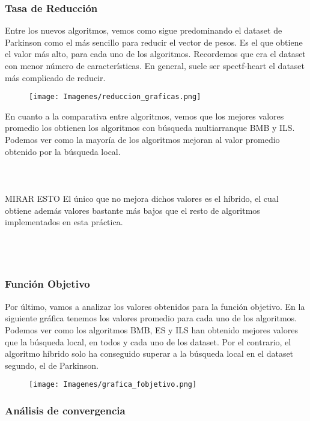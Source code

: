 \documentclass[10pt, a4paper]{article}
\theoremstyle{theorem-style}
\theoremstyle{theorem-style}
\theoremstyle{theorem2-style}
\theoremstyle{definition-style}
\theoremstyle{remark-style}
\theoremstyle{example-style}
\theoremstyle{definition-style}
\theoremstyle{remark-style}
\theoremstyle{remark-style}
\begin{document}
\subsubsection{Tasa de Reducción}

Entre los nuevos algoritmos, vemos como sigue predominando el dataset de Parkinson como el más sencillo para reducir el vector de pesos. Es el que obtiene el valor más alto, para cada uno de los algoritmos. Recordemos que era el dataset con menor número de características. En general, suele ser spectf-heart el dataset más complicado de reducir. 
\pagebreak
\begin{figure}[htp]
\centering
\texttt{[image: Imagenes/reduccion\_graficas.png]}
\label{}
\end{figure}

En cuanto a la comparativa entre algoritmos, vemos que los mejores valores promedio los obtienen los algoritmos con búsqueda multiarranque BMB y ILS. Podemos ver como la mayoría de los algoritmos mejoran al valor promedio obtenido por la búsqueda local. \\\\\\\\
MIRAR ESTO
El único que no mejora dichos valores es el híbrido, el cual obtiene además valores bastante más bajos que el resto de algoritmos implementados en esta práctica. \\\\\\\\

\subsubsection{Función Objetivo}

Por último, vamos a analizar los valores obtenidos para la función objetivo. En la siguiente gráfica tenemos los valores promedio para cada uno de los algoritmos. Podemos ver como los algoritmos BMB, ES y ILS han obtenido mejores valores que la búsqueda local, en todos y cada uno de los dataset. Por el contrario, el algoritmo híbrido solo ha conseguido superar a la búsqueda local en el dataset segundo, el de Parkinson. 

\begin{figure}[htp]
\centering
\texttt{[image: Imagenes/grafica\_fobjetivo.png]}
\label{}
\end{figure}

\newpage
\subsubsection{Análisis de convergencia}
\end{document}
